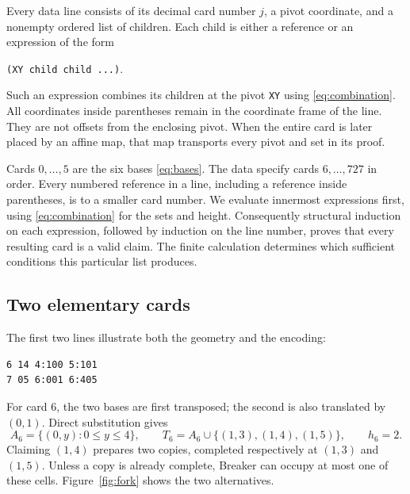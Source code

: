 Every data line consists of its decimal card number $j$, a pivot
coordinate, and a nonempty ordered list of children. Each child is
either a reference or an expression of the form
\begin{center}
\texttt{(XY child child ...)}.
\end{center}
Such an expression combines its children at the pivot \texttt{XY}
using \eqref{eq:combination}. All coordinates inside parentheses
remain in the coordinate frame of the line. They are not offsets
from the enclosing pivot. When the entire card is later placed by
an affine map, that map transports every pivot and set in its proof.

Cards $0,\ldots,5$ are the six bases \eqref{eq:bases}.
The data specify cards $6,\ldots,727$ in order. Every numbered
reference in a line, including a reference inside parentheses,
is to a smaller card number. We evaluate innermost expressions
first, using \eqref{eq:combination} for the sets and height.
Consequently structural induction on each expression, followed by
induction on the line number, proves that every resulting card is
a valid claim. The finite calculation determines which sufficient
conditions this particular list produces.

\subsection{Two elementary cards}

The first two lines illustrate both the geometry and the encoding:
\begin{lstlisting}[basicstyle=\ttfamily\small]
6 14 4:100 5:101
7 05 6:001 6:405
\end{lstlisting}
For card $6$, the two bases are first transposed; the second is also
translated by $(0,1)$. Direct substitution gives
\begin{equation}\label{eq:first-card}
 A_6=\{(0,y):0\le y\le4\},\qquad
 T_6=A_6\cup\{(1,3),(1,4),(1,5)\},\qquad h_6=2.
\end{equation}
Claiming $(1,4)$ prepares two copies, completed respectively at
$(1,3)$ and $(1,5)$. Unless a copy is already complete, Breaker
can occupy at most one of these cells. Figure~\ref{fig:fork}
shows the two alternatives.


